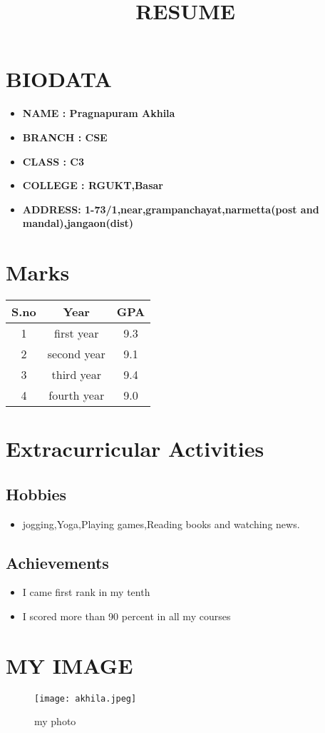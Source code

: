 \documentclass{article}
\title{RESUME}
\begin{document}
  
\section{\color{red}BIODATA }
\begin{itemize}
    \item \textbf{NAME  : \color{blue} Pragnapuram Akhila } 
    \item \textbf{BRANCH : \color{blue} CSE}
\item \textbf{CLASS : \color{blue} C3}
\item \textbf{COLLEGE : \color{blue} RGUKT,Basar}
\item \textbf{ADDRESS: \color{blue}1-73/1,near,grampanchayat,narmetta(post and mandal),jangaon(dist)}
\end{itemize}

\section{
\color{red} Marks}
\begin{tabular}{|c|c|c|}
\hline
   S.no & Year  & GPA\\
   \hline
    1 & first year & 9.3 \\
    \hline
    2 & second year & 9.1 \\
    \hline
    3 & third year & 9.4 \\
    \hline 
    4 & fourth year & 9.0\\
    \hline
\end{tabular}
\section{\color{red}Extracurricular Activities}

\subsection{ \color{violet}Hobbies}
\begin{itemize}
    \item \textbf{}{\color{blue}jogging,Yoga,Playing games,Reading books and watching news.}
\end{itemize}
  
  \subsection{\color{violet} Achievements}
  \begin{itemize}
      \item I came first rank in my tenth
      \item I scored more than 90 percent in all my courses
  \end{itemize}
\section{ \color{red} MY IMAGE}
  \begin{figure}[h]
      \centering
      \texttt{[image: akhila.jpeg]}
      \caption{my photo}
  \end{figure}
 
\end{document}
